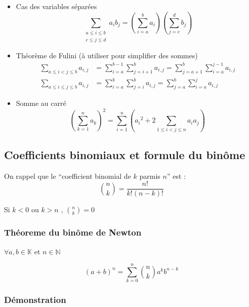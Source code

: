 \documentclass{report}
\newcommand{\N}{\mathbb{N}}
\begin{document}
        \begin{itemize}[label=$\rightarrow$]
          \item Cas des variables séparées
            \[
              \sum_{\substack{a \le i \le b \\ c \le j \le d}} a_ib_j= \left(\sum_{i=a}^{b}a_i\right)\left(\sum_{j=c}^{d} b_j\right)
            \]
          \item  Théorème de Fulini (à utiliser pour simplifier des sommes)
            \begin{align*}
              \sum_{a\le i<j\le b} a_{i,j} &= \sum_{i=a}^{b-1}\sum_{j=i+1}^{b} a_{i,j}= \sum_{j=a+1}^{b}\sum_{i=a}^{j-1} a_{i,j} \\
              \sum_{a\le i\le j\le b} a_{i,j} &= \sum_{i=a}^{b}\sum_{j=i}^{b} a_{i,j}= \sum_{j=a}^{b}\sum_{i=a}^{j} a_{i,j} 
            \end{align*}
          \item Somme au carré
            \[
              \left(\sum_{k=1}^{n} a_k\right)^2 = \sum_{i=1}^{n} \left({a_i}^2 + 2\sum_{1\le i<j \le n} a_ia_j\right)
            \]
        \end{itemize}


    
        
    \newpage
      
    \subsection{Coefficients binomiaux et formule du binôme}

        On rappel que le ``coefficient binomial de $k$ parmis $n$'' est : \[\displaystyle\binom{n}{k} = \frac{n!}{k!(n - k)!}\]

        Si $k<0$ ou $k>n$ , $\binom{n}{k} =0$

        \subsubsection{Théoreme du binôme de Newton}

          $\forall a,b\in\mathbb{K}$ et $n\in\N$

          \[(a+b)^n = \sum_{k=0}^{n} \binom{n}{k} a^k b^{n-k}\]

        \subsubsection{Démonstration}
\end{document}
